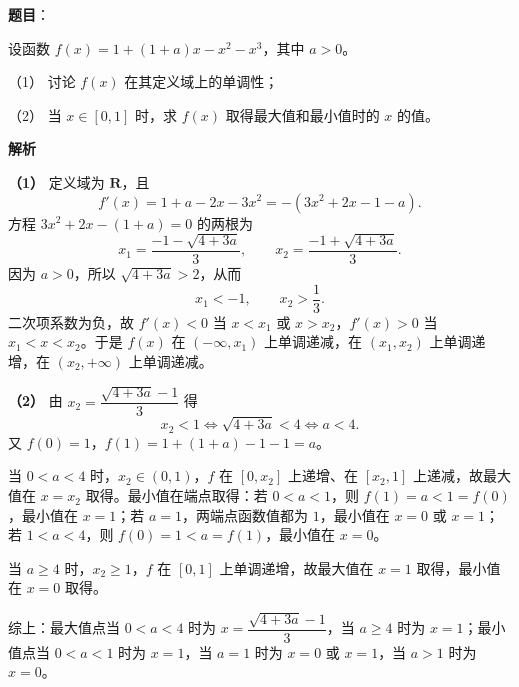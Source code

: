 \begin{answer}

\textbf{题目}：

设函数 $f(x)=1+(1+a)x-x^2-x^3$，其中 $a>0$。

（1） 讨论 $f(x)$ 在其定义域上的单调性；

（2） 当 $x\in[0,1]$ 时，求 $f(x)$ 取得最大值和最小值时的 $x$ 的值。

\textbf{解析}

\textbf{（1）} 定义域为 $\mathbf R$，且
\nopagebreak[4]
\[f'(x)=1+a-2x-3x^2=-(3x^2+2x-1-a).\]
方程 $3x^2+2x-(1+a)=0$ 的两根为
\nopagebreak[4]
\[x_1=\frac{-1-\sqrt{4+3a}}3,\qquad
x_2=\frac{-1+\sqrt{4+3a}}3 .\]
因为 $a>0$，所以 $\sqrt{4+3a}>2$，从而
\nopagebreak[4]
\[x_1<-1,\qquad x_2>\frac13 .\]
二次项系数为负，故 $f'(x)<0$ 当 $x<x_1$ 或 $x>x_2$，$f'(x)>0$ 当 $x_1<x<x_2$。于是 $f(x)$ 在 $(-\infty,x_1)$ 上单调递减，在 $(x_1,x_2)$ 上单调递增，在 $(x_2,+\infty)$ 上单调递减。

\textbf{（2）} 由 $x_2=\dfrac{\sqrt{4+3a}-1}{3}$ 得
\nopagebreak[4]
\[x_2<1\iff \sqrt{4+3a}<4\iff a<4 .\]
又 $f(0)=1$，$f(1)=1+(1+a)-1-1=a$。

当 $0<a<4$ 时，$x_2\in(0,1)$，$f$ 在 $[0,x_2]$ 上递增、在 $[x_2,1]$ 上递减，故最大值在 $x=x_2$ 取得。最小值在端点取得：若 $0<a<1$，则 $f(1)=a<1=f(0)$，最小值在 $x=1$；若 $a=1$，两端点函数值都为 $1$，最小值在 $x=0$ 或 $x=1$；若 $1<a<4$，则 $f(0)=1<a=f(1)$，最小值在 $x=0$。

当 $a\geqslant4$ 时，$x_2\geqslant1$，$f$ 在 $[0,1]$ 上单调递增，故最大值在 $x=1$ 取得，最小值在 $x=0$ 取得。

综上：最大值点当 $0<a<4$ 时为 $x=\dfrac{\sqrt{4+3a}-1}{3}$，当 $a\geqslant4$ 时为 $x=1$；最小值点当 $0<a<1$ 时为 $x=1$，当 $a=1$ 时为 $x=0$ 或 $x=1$，当 $a>1$ 时为 $x=0$。



\end{answer}

